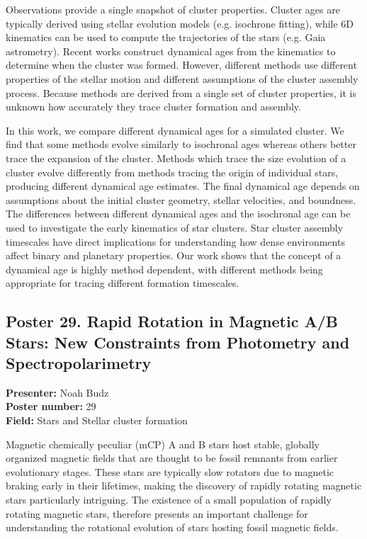Observations provide a single snapshot of cluster properties. Cluster ages are typically derived using stellar evolution models (e.g. isochrone fitting), while 6D kinematics can be used to compute the trajectories of the stars (e.g. Gaia astrometry). Recent works construct dynamical ages from the kinematics to determine when the cluster was formed. However, different methods use different properties of the stellar motion and different assumptions of the cluster assembly process. Because methods are derived from a single set of cluster properties, it is unknown how accurately they trace cluster formation and assembly.

In this work, we compare different dynamical ages for a simulated cluster. We find that some methods evolve similarly to isochronal ages whereas others better trace the expansion of the cluster. Methods which trace the size evolution of a cluster evolve differently from methods tracing the origin of individual stars, producing different dynamical age estimates. The final dynamical age depends on assumptions about the initial cluster geometry, stellar velocities, and boundness. The differences between different dynamical ages and the isochronal age can be used to investigate the early kinematics of star clusters. Star cluster assembly timescales have direct implications for understanding how dense environments affect binary and planetary properties. Our work shows that the concept of a dynamical age is highly method dependent, with different methods being appropriate for tracing different formation timescales.

\hypertarget{poster-abstract-talk-190}{}\label{poster-abstract-page-talk-190}
\subsection*{Poster 29. Rapid Rotation in Magnetic A/B Stars: New Constraints from Photometry and Spectropolarimetry}
\textbf{Presenter:} Noah Budz\\
\textbf{Poster number:} 29\\
\textbf{Field:} Stars and Stellar cluster formation

Magnetic chemically peculiar (mCP) A and B stars host stable, globally organized magnetic fields that are thought to be fossil remnants from earlier evolutionary stages. These stars are typically slow rotators due to magnetic braking early in their lifetimes, making the discovery of rapidly rotating magnetic stars particularly intriguing. The existence of a small population of rapidly rotating magnetic stars, therefore presents an important challenge for understanding the rotational evolution of stars hosting fossil magnetic fields.

